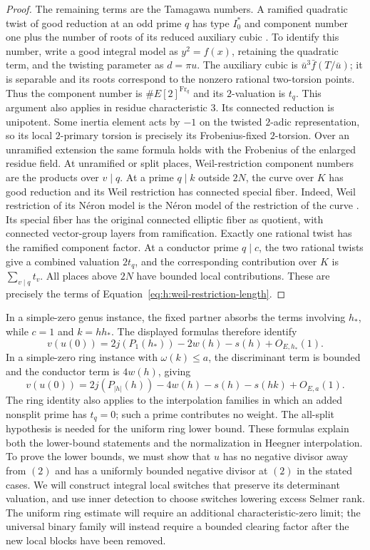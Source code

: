 \begin{proof}
The remaining terms are the Tamagawa numbers. A ramified quadratic
twist of good reduction at an odd prime $q$ has type $I_0^*$ and
component number one plus the number of roots of its reduced auxiliary
cubic \citep[Theorem~4.1, Table~4 and proof, Case~3]{BarriosEtAl2025}.
To identify this number, write a good integral model as $y^2=f(x)$,
retaining the quadratic term, and the twisting parameter as $d=\pi u$.
The auxiliary cubic is $\bar u^3\bar f(T/\bar u)$; it is separable
and its roots correspond to the nonzero rational two-torsion points.
Thus the component number is $\#E[2]^{\mathrm{Fr}_q}$ and its
$2$-valuation is $t_q$. This argument also applies in residue
characteristic $3$. Its connected reduction is unipotent. Some inertia element acts
by $-1$ on the twisted $2$-adic representation, so its local
$2$-primary torsion is precisely its Frobenius-fixed $2$-torsion.
Over an unramified extension the same formula holds with the
Frobenius of the enlarged residue field. At unramified
or split places, Weil-restriction component numbers are the products
over $v\mid q$. At a prime $q\mid k$ outside $2N$, the curve over
$K$ has good reduction and its Weil restriction has connected special
fiber. Indeed, Weil restriction of its N\'eron model is the N\'eron
model of the restriction of the curve
\citep[Section~7.6, Proposition~6]{BoschLutkebohmertRaynaud1990}.
Its special fiber has the original connected elliptic fiber as quotient,
with connected vector-group layers from ramification. Exactly one rational twist
has the ramified component factor. At a conductor prime $q\mid c$,
the two rational twists give a combined valuation $2t_q$, and the
corresponding contribution over $K$ is $\sum_{v\mid q}t_v$. All
places above $2N$ have bounded local contributions. These are precisely
the terms of Equation~\eqref{eq:h:weil-restriction-length}.
\end{proof}


In a simple-zero genus instance, the fixed partner absorbs the terms involving $h_*$,
while $c=1$ and $k=hh_*$. The displayed formulas therefore identify
\[
 v(u(0))=2j(P_1(h_*))-2w(h)-s(h)+O_{E,h_*}(1).
\]
In a simple-zero ring instance with $\omega(k)\le a$, the discriminant term
is bounded and the conductor term is $4w(h)$, giving
\[
 v(u(0))=2j(P_{|h|}(h))-4w(h)-s(h)-s(hk)+O_{E,a}(1).
\]
The ring identity also applies to the interpolation families in which
an added nonsplit prime has $t_q=0$; such a prime contributes no weight.
The all-split hypothesis is needed for the uniform ring lower bound.
These formulas explain both the lower-bound statements and the
normalization in Heegner interpolation. To prove the lower bounds,
we must show that $u$ has no negative divisor away from $(2)$ and
has a uniformly bounded negative divisor at $(2)$ in the stated
cases. We will construct integral local switches that preserve its determinant
valuation, and use inner detection to choose switches lowering excess
Selmer rank.
The uniform ring estimate will require an additional characteristic-zero
limit; the universal binary family will instead require a bounded
clearing factor after the new local blocks have been removed.


